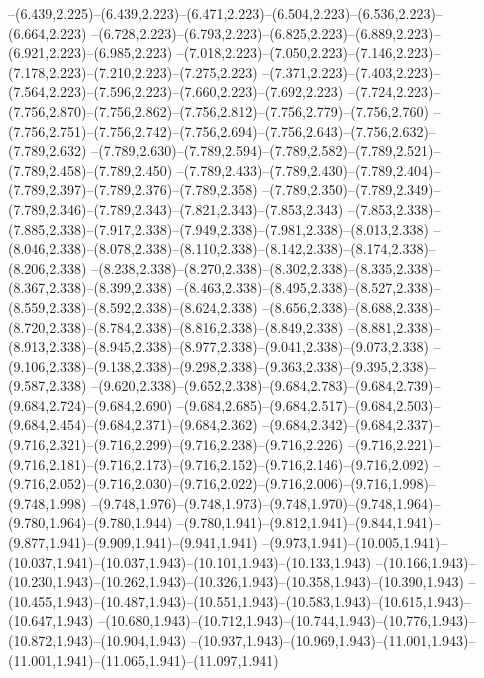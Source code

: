   --(6.439,2.225)--(6.439,2.223)--(6.471,2.223)--(6.504,2.223)--(6.536,2.223)--(6.664,2.223)%
  --(6.728,2.223)--(6.793,2.223)--(6.825,2.223)--(6.889,2.223)--(6.921,2.223)--(6.985,2.223)%
  --(7.018,2.223)--(7.050,2.223)--(7.146,2.223)--(7.178,2.223)--(7.210,2.223)--(7.275,2.223)%
  --(7.371,2.223)--(7.403,2.223)--(7.564,2.223)--(7.596,2.223)--(7.660,2.223)--(7.692,2.223)%
  --(7.724,2.223)--(7.756,2.870)--(7.756,2.862)--(7.756,2.812)--(7.756,2.779)--(7.756,2.760)%
  --(7.756,2.751)--(7.756,2.742)--(7.756,2.694)--(7.756,2.643)--(7.756,2.632)--(7.789,2.632)%
  --(7.789,2.630)--(7.789,2.594)--(7.789,2.582)--(7.789,2.521)--(7.789,2.458)--(7.789,2.450)%
  --(7.789,2.433)--(7.789,2.430)--(7.789,2.404)--(7.789,2.397)--(7.789,2.376)--(7.789,2.358)%
  --(7.789,2.350)--(7.789,2.349)--(7.789,2.346)--(7.789,2.343)--(7.821,2.343)--(7.853,2.343)%
  --(7.853,2.338)--(7.885,2.338)--(7.917,2.338)--(7.949,2.338)--(7.981,2.338)--(8.013,2.338)%
  --(8.046,2.338)--(8.078,2.338)--(8.110,2.338)--(8.142,2.338)--(8.174,2.338)--(8.206,2.338)%
  --(8.238,2.338)--(8.270,2.338)--(8.302,2.338)--(8.335,2.338)--(8.367,2.338)--(8.399,2.338)%
  --(8.463,2.338)--(8.495,2.338)--(8.527,2.338)--(8.559,2.338)--(8.592,2.338)--(8.624,2.338)%
  --(8.656,2.338)--(8.688,2.338)--(8.720,2.338)--(8.784,2.338)--(8.816,2.338)--(8.849,2.338)%
  --(8.881,2.338)--(8.913,2.338)--(8.945,2.338)--(8.977,2.338)--(9.041,2.338)--(9.073,2.338)%
  --(9.106,2.338)--(9.138,2.338)--(9.298,2.338)--(9.363,2.338)--(9.395,2.338)--(9.587,2.338)%
  --(9.620,2.338)--(9.652,2.338)--(9.684,2.783)--(9.684,2.739)--(9.684,2.724)--(9.684,2.690)%
  --(9.684,2.685)--(9.684,2.517)--(9.684,2.503)--(9.684,2.454)--(9.684,2.371)--(9.684,2.362)%
  --(9.684,2.342)--(9.684,2.337)--(9.716,2.321)--(9.716,2.299)--(9.716,2.238)--(9.716,2.226)%
  --(9.716,2.221)--(9.716,2.181)--(9.716,2.173)--(9.716,2.152)--(9.716,2.146)--(9.716,2.092)%
  --(9.716,2.052)--(9.716,2.030)--(9.716,2.022)--(9.716,2.006)--(9.716,1.998)--(9.748,1.998)%
  --(9.748,1.976)--(9.748,1.973)--(9.748,1.970)--(9.748,1.964)--(9.780,1.964)--(9.780,1.944)%
  --(9.780,1.941)--(9.812,1.941)--(9.844,1.941)--(9.877,1.941)--(9.909,1.941)--(9.941,1.941)%
  --(9.973,1.941)--(10.005,1.941)--(10.037,1.941)--(10.037,1.943)--(10.101,1.943)--(10.133,1.943)%
  --(10.166,1.943)--(10.230,1.943)--(10.262,1.943)--(10.326,1.943)--(10.358,1.943)--(10.390,1.943)%
  --(10.455,1.943)--(10.487,1.943)--(10.551,1.943)--(10.583,1.943)--(10.615,1.943)--(10.647,1.943)%
  --(10.680,1.943)--(10.712,1.943)--(10.744,1.943)--(10.776,1.943)--(10.872,1.943)--(10.904,1.943)%
  --(10.937,1.943)--(10.969,1.943)--(11.001,1.943)--(11.001,1.941)--(11.065,1.941)--(11.097,1.941)%
